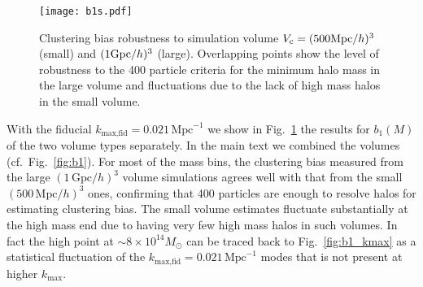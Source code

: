 \documentclass[prd,twocolumn,amsmath,amssymb,floatfix,superscriptaddress]{revtex4-1}
\newcommand{\VL}{V_\textrm{c}}
\begin{document}
\begin{figure}[tb]
    \centering
    \texttt{[image: b1s.pdf]}
    \caption{\footnotesize
        Clustering bias robustness to simulation volume $\VL = (500{\rm Mpc}/h)^3$ (small)
        and $(1{\rm Gpc}/h)^3$ (large).  Overlapping points show the level of robustness to the
        400 particle criteria for the minimum halo mass in the large volume
         and fluctuations due to the lack of high mass halos in the small volume.    }
    \label{fig:b1s}
\end{figure}

With the fiducial $k_\textrm{max,fid}=0.021\,\textrm{Mpc}^{-1}$ we show in Fig.~\ref{fig:b1s}  the
results for $b_1(M)$ of the two volume  types separately.  In the main text we combined the volumes (cf.~Fig.~\ref{fig:b1}).
For most of the mass bins, the clustering bias measured from the large $(1\,\textrm{Gpc}/h)^3$
volume simulations agrees well with that from the small $(500\,\textrm{Mpc}/h)^3$ ones,
confirming that 400 particles are enough to resolve halos for estimating clustering bias.
 The small volume estimates fluctuate substantially 
at the high mass end due to having very few high mass halos in such volumes.
In fact the high point at $\sim 8\times 10^{14}M_\odot$ can be traced back to 
Fig.~\ref{fig:b1_kmax} as a statistical fluctuation of the $k_\textrm{max,fid}=0.021\,\textrm{Mpc}^{-1}$ modes that is not present at higher $k_\textrm{max}.$


\vfill


\end{document}
